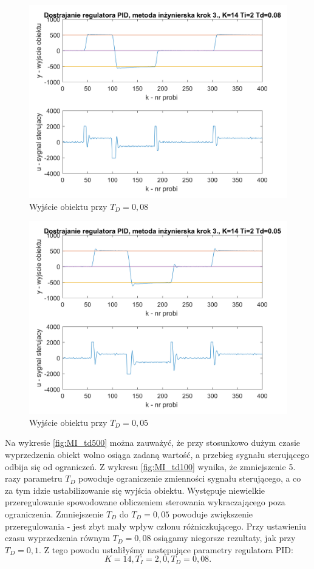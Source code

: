 \documentclass[a4paper, 10pt]{article}
\begin{document}
\begin{figure}[H]
	\centering
	\includegraphics[width=0.9\linewidth]{MI_td80}
	\caption{Wyjście obiektu przy $T_{D}=0,08$ }
	\label{fig:MI_td80}
\end{figure}
\begin{figure}[H]
	\centering
	\includegraphics[width=0.9\linewidth]{MI_td50}
	\caption{Wyjście obiektu przy $T_{D}=0,05$ }
	\label{fig:MI_td50}
\end{figure}

Na wykresie \ref{fig:MI_td500} można zauważyć, że przy stosunkowo dużym czasie wyprzedzenia obiekt wolno osiąga zadaną wartość, a przebieg sygnału sterującego odbija się od ograniczeń. Z wykresu \ref{fig:MI_td100} wynika, że zmniejszenie 5. razy parametru $T_{D}$ powoduje ograniczenie zmienności sygnału sterującego, a co za tym idzie ustabilizowanie się wyjścia obiektu. Występuje niewielkie przeregulowanie spowodowane obliczeniem sterowania wykraczającego poza ograniczenia. Zmniejszenie $T_{D}$ do $T_{D}=0,05$ powoduje zwiększenie przeregulowania - jest zbyt mały wpływ członu różniczkującego. Przy ustawieniu czasu wyprzedzenia równym $T_{D}=0,08$ osiągamy niegorsze rezultaty, jak przy $T_{D}=0,1$. Z tego powodu ustaliłyśmy następujące parametry regulatora PID:
\[K=14,   T_{I}=2,0,   T_{D}=0,08.\]
\end{document}
